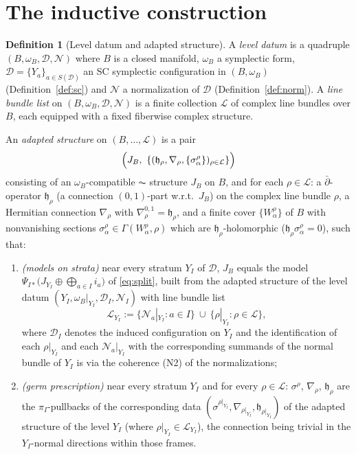 \documentclass[11pt]{amsart}
\theoremstyle{plain}
\theoremstyle{definition}
\newtheorem{definition}[theorem]{Definition}
\newcommand{\NN}{\mathcal{N}}
\newcommand{\DD}{\mathcal{D}}
\newcommand{\LL}{\mathcal{L}}
\newcommand{\hh}{\mathfrak{h}}
\begin{document}
\section{The inductive construction}\label{sec:induction}

\begin{definition}[Level datum and adapted structure]\label{def:adapted}
A \emph{level datum} is a quadruple $(B,\omega_B,\DD,\NN)$ where $B$ is a
closed manifold, $\omega_B$ a symplectic form, $\DD=\{Y_a\}_{a\in S(\DD)}$ an
SC symplectic configuration in $(B,\omega_B)$ (Definition~\ref{def:sc}) and
$\NN$ a normalization of $\DD$ (Definition~\ref{def:norm}). A \emph{line
bundle list} on $(B,\omega_B,\DD,\NN)$ is a finite collection $\LL$ of
complex line bundles over $B$, each equipped with a fixed fiberwise complex
structure.

An \emph{adapted structure} on $(B,\dots,\LL)$ is a pair
\[
 \Bigl(J_B,\ \{(\hh_\rho,\nabla_\rho,\{\sigma^{\rho}_\alpha\})_{\rho\in\LL}\}\Bigr)
\]
consisting of an $\omega_B$-compatible $\AC$ structure $J_B$ on $B$, and for
each $\rho\in\LL$: a $\bar\partial$-operator $\hh_\rho$ (a connection
$(0,1)$-part w.r.t.\ $J_B$) on the complex line bundle $\rho$, a Hermitian
connection $\nabla_\rho$ with $\nabla_\rho^{0,1}=\hh_\rho$, and a finite cover
$\{W^{\rho}_\alpha\}$ of $B$ with nonvanishing sections
$\sigma^\rho_\alpha\in\Gamma(W^\rho_\alpha,\rho)$ which are
$\hh_\rho$-holomorphic ($\hh_\rho\sigma^\rho_\alpha=0$), such that:
\begin{enumerate}
\item[(A1)] \emph{(models on strata)} near every stratum $Y_I$ of $\DD$,
$J_B$ equals the model
$\Psi_{I*}\bigl(J_{Y_I}\oplus\bigoplus_{a\in I}i_a\bigr)$ of
\eqref{eq:split}, built from the adapted structure of the level datum
$(Y_I,\omega_B|_{Y_I},\DD_I,\NN_I)$ with line bundle list
\[
 \LL_{Y_I}:=\{\NN_a|_{Y_I}:a\in I\}\ \cup\ \{\rho|_{Y_I}:\rho\in\LL\},
\]
where $\DD_I$ denotes the induced configuration on $Y_I$ and the
identification of each $\rho|_{Y_I}$ and each $\NN_a|_{Y_I}$ with the
corresponding summands of the normal bundle of $Y_I$ is via the coherence
(N2) of the normalizations;
\item[(A2)] \emph{(germ prescription)} near every stratum $Y_I$ and for every
$\rho\in\LL$: $\sigma^{\rho}$, $\nabla_\rho$, $\hh_\rho$ are the
$\pi_I$-pullbacks of the corresponding data
$(\sigma^{\rho|_{Y_I}},\nabla_{\rho|_{Y_I}},\hh_{\rho|_{Y_I}})$ of the adapted
structure of the level $Y_I$ (where $\rho|_{Y_I}\in\LL_{Y_I}$), the
connection being trivial in the $Y_I$-normal directions within those frames.
\end{enumerate}
\end{definition}
\end{document}
